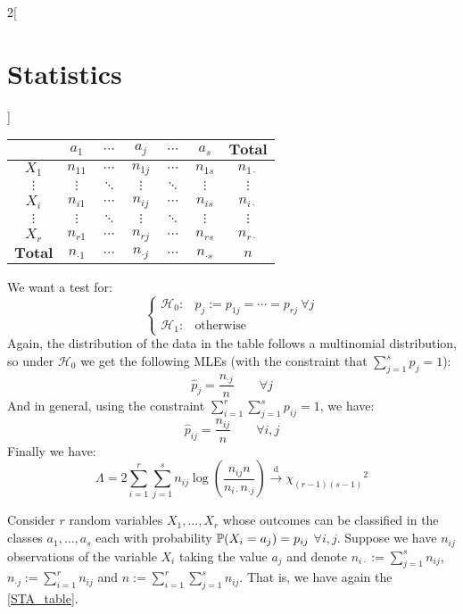 \documentclass[../../../main.tex]{subfiles}
\begin{document}
\begin{multicols}{2}[\section{Statistics}]
\begin{definition}
    \begin{center}
      \begin{minipage}{\linewidth}
        \centering
        \begin{tabular}{c||ccccc|c}
                           & $a_1$         & $\cdots$ & $a_j$         & $\cdots$ & $a_s$         & $\mathbf{Total}$ \\
          \hline\hline
          $X_1$            & $n_{11}$      & $\cdots$ & $n_{1j}$      & $\cdots$ & $n_{1s}$      & $n_{1\cdot}$     \\
          $\vdots$         & $\vdots$      & $\ddots$ & $\vdots$      & $\ddots$ & $\vdots$      & $\vdots$         \\
          $X_i$            & $n_{i1}$      & $\cdots$ & $n_{ij}$      & $\cdots$ & $n_{is}$      & $n_{i\cdot}$     \\
          $\vdots$         & $\vdots$      & $\ddots$ & $\vdots$      & $\ddots$ & $\vdots$      & $\vdots$         \\
          $X_r$            & $n_{r1}$      & $\cdots$ & $n_{rj}$      & $\cdots$ & $n_{rs}$      & $n_{r\cdot}$     \\
          \hline
          $\mathbf{Total}$ & $n_{\cdot 1}$ & $\cdots$ & $n_{\cdot j}$ & $\cdots$ & $n_{\cdot s}$ & $n$
        \end{tabular}
        \label{STA_table}
      \end{minipage}
    \end{center}
    We want a test for:
    $$
      \begin{cases}
        \mathcal{H}_0: & p_j:=p_{1j}=\cdots=p_{rj}\ \forall j \\
        \mathcal{H}_1: & \text{otherwise}
      \end{cases}
    $$
    Again, the distribution of the data in the table follows a multinomial distribution, so under $\mathcal{H}_0$ we get the following MLEs (with the constraint that $\sum_{j=1}^sp_{j}=1$):
    $$\hat{p}_j=\frac{n_{\cdot j}}{n}\qquad\forall j$$
    And in general, using the constraint $\sum_{i=1}^r\sum_{j=1}^sp_{ij}=1$, we have: $$\hat{p}_{ij}=\frac{n_{ij}}{n}\qquad\forall i,j$$
    Finally we have: $$\Lambda=2\sum_{i=1}^r\sum_{j=1}^sn_{ij}\log\left(\frac{n_{ij}n}{n_{i\cdot}n_{\cdot j}}\right)\overset{\text{d}}{\longrightarrow}{\chi_{(r-1)(s-1)}}^2$$
  \end{definition}
  \begin{definition}
    Consider $r$ \iid random variables $X_1,\ldots,X_r$ whose outcomes can be classified in the classes $a_1,\ldots,a_s$ each with probability $\mathbb{P}(X_i=a_j)=p_{ij}$ $\forall i,j$. Suppose we have $n_{ij}$ observations of the variable $X_i$ taking the value $a_j$ and denote $n_{i\cdot}:=\sum_{j=1}^sn_{ij}$, $n_{\cdot j}:=\sum_{i=1}^rn_{ij}$ and $n:=\sum_{i=1}^r\sum_{j=1}^sn_{ij}$. That is, we have again the \cref{STA_table}.

\end{definition}
\end{multicols}
\end{document}
